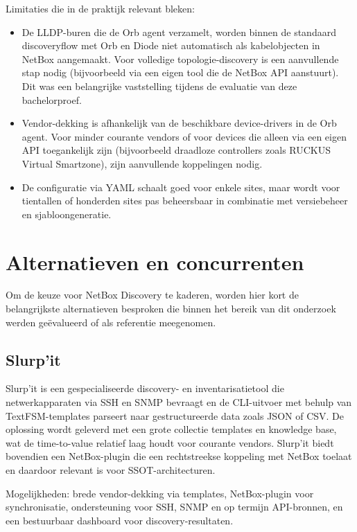 Limitaties die in de praktijk relevant bleken:
\begin{itemize}
  \item De LLDP-buren die de Orb agent verzamelt, worden binnen de standaard discoveryflow met Orb en Diode niet automatisch als kabelobjecten in NetBox aangemaakt. Voor volledige topologie-discovery is een aanvullende stap nodig (bijvoorbeeld via een eigen tool die de NetBox API aanstuurt). Dit was een belangrijke vaststelling tijdens de evaluatie van deze bachelorproef.
  \item Vendor-dekking is afhankelijk van de beschikbare device-drivers in de Orb agent. Voor minder courante vendors of voor devices die alleen via een eigen API toegankelijk zijn (bijvoorbeeld draadloze controllers zoals RUCKUS Virtual Smartzone\autocite{RuckusVSZ}), zijn aanvullende koppelingen nodig.
  \item De configuratie via YAML schaalt goed voor enkele sites, maar wordt voor tientallen of honderden sites pas beheersbaar in combinatie met versiebeheer en sjabloongeneratie.
\end{itemize}

\section{Alternatieven en concurrenten}
\label{sec:alternatieven}

Om de keuze voor NetBox Discovery te kaderen, worden hier kort de belangrijkste alternatieven besproken die binnen het bereik van dit onderzoek werden ge\"evalueerd of als referentie meegenomen.

\subsection{Slurp'it}

Slurp'it is een gespecialiseerde discovery- en inventarisatietool die netwerkapparaten via SSH en SNMP bevraagt en de CLI-uitvoer met behulp van TextFSM-templates parseert naar gestructureerde data zoals JSON of CSV\autocite{SlurpitProduct,SlurpitPacketCoders}. De oplossing wordt geleverd met een grote collectie templates en knowledge base, wat de time-to-value relatief laag houdt voor courante vendors. Slurp'it biedt bovendien een NetBox-plugin die een rechtstreekse koppeling met NetBox toelaat en daardoor relevant is voor SSOT-architecturen.

Mogelijkheden: brede vendor-dekking via templates, NetBox-plugin voor synchronisatie, ondersteuning voor SSH, SNMP en op termijn API-bronnen, en een bestuurbaar dashboard voor discovery-resultaten\autocite{SlurpitProduct}.


